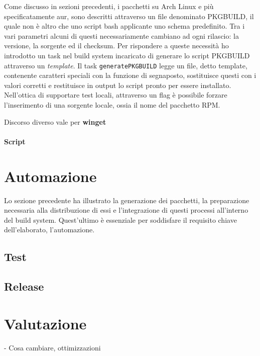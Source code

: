 Come discusso in sezioni precedenti, i pacchetti su Arch Linux e più specificatamente \ac{aur}, sono descritti attraverso un file denominato PKGBUILD, il quale non è altro che uno script bash applicante uno schema predefinito. Tra i vari parametri alcuni di questi necessariamente cambiano ad ogni rilascio: la versione, la sorgente ed il checksum. Per rispondere a queste necessità ho introdotto un task nel build system incaricato di generare lo script PKGBUILD attraverso un \textit{template}. Il task \texttt{generatePKGBUILD} legge un file, detto template, contenente caratteri speciali con la funzione di segnaposto, sostituisce questi con i valori corretti e restituisce in output lo script pronto per essere installato. Nell'ottica di supportare test locali, attraverso un flag è possibile forzare l'inserimento di una sorgente locale, ossia il nome del pacchetto RPM.

Discorso diverso vale per \textbf{winget}

\paragraph{Script}

\section{Automazione}
Lo sezione precedente ha illustrato la generazione dei pacchetti, la preparazione necessaria alla distribuzione di essi e l'integrazione di questi processi all'interno del build system. Quest'ultimo è essenziale per soddisfare il requisito chiave dell'elaborato, l'automazione. 

\subsection{Test}

\subsection{Release}

\section{Valutazione}

- Cosa cambiare, ottimizzazioni
